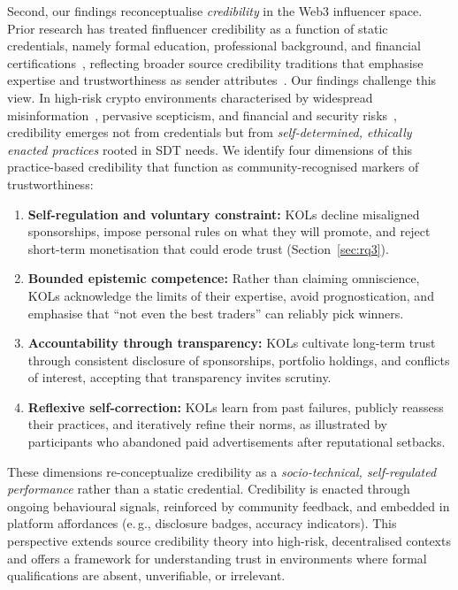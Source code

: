 Second, our findings reconceptualise \emph{credibility} in the Web3 influencer space. Prior research has treated finfluencer credibility as a function of static credentials, namely formal education, professional background, and financial certifications~\cite{NurhandayaniWhoDeserves2025}, reflecting broader source credibility traditions that emphasise expertise and trustworthiness as sender attributes~\cite{Metzger2013CredibilityReview,Wathen2002Credibility,Sundar2008MAIN,Flanagin2007UGC,fogg2001credibility}. Our findings challenge this view. In high-risk crypto environments characterised by widespread misinformation~\cite{Cernera2023rugpulls}, pervasive scepticism, and financial and security risks~\cite{Si2024CHI}, credibility emerges not from credentials but from \emph{self-determined, ethically enacted practices} rooted in SDT needs. We identify four dimensions of this practice-based credibility that function as community-recognised markers of trustworthiness:

\begin{enumerate}[leftmargin=*, nosep]
  \item \textbf{Self-regulation and voluntary constraint:} KOLs decline misaligned sponsorships, impose personal rules on what they will promote, and reject short-term monetisation that could erode trust (Section~\ref{sec:rq3}).
  \item \textbf{Bounded epistemic competence:} Rather than claiming omniscience, KOLs acknowledge the limits of their expertise, avoid prognostication, and emphasise that ``not even the best traders'' can reliably pick winners.
  \item \textbf{Accountability through transparency:} KOLs cultivate long-term trust through consistent disclosure of sponsorships, portfolio holdings, and conflicts of interest, accepting that transparency invites scrutiny.
  \item \textbf{Reflexive self-correction:} KOLs learn from past failures, publicly reassess their practices, and iteratively refine their norms, as illustrated by participants who abandoned paid advertisements after reputational setbacks.
\end{enumerate}

\noindent These dimensions re-conceptualize credibility as a \emph{socio-technical, self-regulated performance} rather than a static credential. Credibility is enacted through ongoing behavioural signals, reinforced by community feedback, and embedded in platform affordances (e.\,g., disclosure badges, accuracy indicators). This perspective extends source credibility theory into high-risk, decentralised contexts and offers a framework for understanding trust in environments where formal qualifications are absent, unverifiable, or irrelevant.


